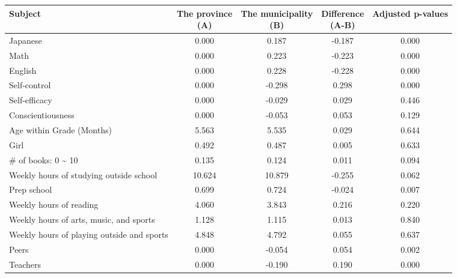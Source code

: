 \begin{tabular}{lcccc}
\hline \hline
Subject & \shortstack{The province\\(A)} & \shortstack{The municipality\\(B)} & \shortstack{Difference\\(A-B)} & Adjusted p-values \\
\hline
Japanese & 0.000 & 0.187 & -0.187 & 0.000 \\
Math & 0.000 & 0.223 & -0.223 & 0.000 \\
English & 0.000 & 0.228 & -0.228 & 0.000 \\
Self-control & 0.000 & -0.298 & 0.298 & 0.000 \\
Self-efficacy & 0.000 & -0.029 & 0.029 & 0.446 \\
Conscientiousness & 0.000 & -0.053 & 0.053 & 0.129 \\
Age within Grade (Months) & 5.563 & 5.535 & 0.029 & 0.644 \\
Girl & 0.492 & 0.487 & 0.005 & 0.633 \\
\# of books: 0 \textasciitilde{} 10 & 0.135 & 0.124 & 0.011 & 0.094 \\
Weekly hours of studying outside school & 10.624 & 10.879 & -0.255 & 0.062 \\
Prep school & 0.699 & 0.724 & -0.024 & 0.007 \\
Weekly hours of reading & 4.060 & 3.843 & 0.216 & 0.220 \\
Weekly hours of arts, music, and sports & 1.128 & 1.115 & 0.013 & 0.840 \\
Weekly hours of playing outside and sports & 4.848 & 4.792 & 0.055 & 0.637 \\
Peers & 0.000 & -0.054 & 0.054 & 0.002 \\
Teachers & 0.000 & -0.190 & 0.190 & 0.000 \\
\hline \hline
\end{tabular}